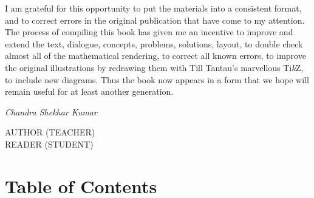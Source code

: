 \vspace{2mm}

I am grateful for this opportunity to put the materials into a consistent format, and to correct errors in the original publication that have come to my attention. The process of compiling this book has given me an incentive to improve and extend the text, dialogue, concepts, problems, solutions, layout, to double check almost all of the mathematical rendering, to correct all known errors, to improve the original illustrations by redrawing them with Till Tantau's marvellous \textup{Ti\textit{k}Z}, to include new diagrams. Thus the book now appears in a form that we hope will remain useful for at least another generation.


\vspace{3mm}

  \hfill \emph{Chandra Shekhar Kumar}


\begin{center}
AUTHOR (TEACHER)  \\
READER (STUDENT) 
\end{center}

\section{Table of Contents}

